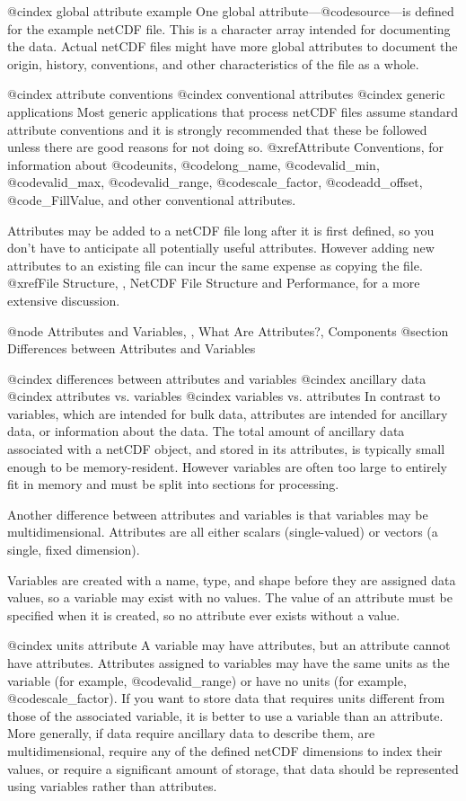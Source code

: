 @cindex global attribute example
One global attribute---@code{source}---is defined
for the example netCDF file.  This is a character array intended for
documenting the data.  Actual netCDF files might have more global
attributes to document the origin, history, conventions, and other
characteristics of the file as a whole.

@cindex attribute conventions
@cindex conventional attributes
@cindex generic applications
Most generic applications that process netCDF files assume
standard attribute conventions and it is strongly recommended that these
be followed unless there are good reasons for not doing so.
@xref{Attribute Conventions}, for information about @code{units},
@code{long_name}, @code{valid_min}, @code{valid_max},
@code{valid_range}, @code{scale_factor}, @code{add_offset},
@code{_FillValue}, and other conventional attributes.

Attributes may be added to a netCDF file long after it is first defined,
so you don't have to anticipate all potentially useful attributes.
However adding new attributes to an existing file can incur the same
expense as copying the file.  @xref{File Structure, , NetCDF File
Structure and Performance}, for a more extensive discussion.

@node   Attributes and Variables,  , What Are Attributes?, Components
@section Differences between Attributes and Variables

@cindex differences between attributes and variables
@cindex ancillary data
@cindex attributes vs. variables
@cindex variables vs. attributes
In contrast to variables, which are intended for bulk data, attributes
are intended for ancillary data, or information about the data.
The total amount of ancillary data associated with a netCDF
object, and stored in its attributes, is typically small enough to be
memory-resident.
However variables are often too large to entirely fit in memory and must
be split into sections for processing.

Another difference between attributes and variables is that variables
may be multidimensional.  Attributes are all either scalars
(single-valued) or vectors (a single, fixed dimension).

Variables are created with a name, type, and shape before they are assigned
data values, so a variable may exist with no values.  The value of an
attribute must be specified when it is created, so no attribute ever
exists without a value.

@cindex units attribute
A variable may have attributes, but an attribute cannot have attributes.
Attributes assigned to variables may have the same units as the variable
(for example, @code{valid_range}) or have no units (for example,
@code{scale_factor}).  If you want to store data that
requires units different from those of the associated variable, it is
better to use a variable than an attribute.  More generally, if data
require ancillary data to describe them, are multidimensional, require
any of the defined netCDF dimensions to index their values, or require a
significant amount of storage, that data should be represented using
variables rather than attributes.

